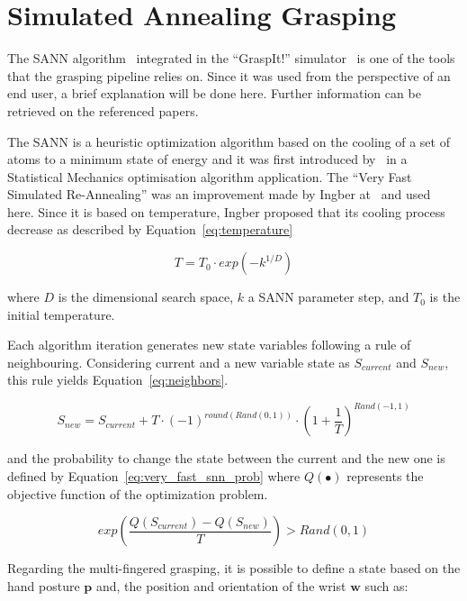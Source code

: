 \section{Simulated Annealing Grasping}
\label{sec:sim_ann}

The \ac{SANN} algorithm~\cite{Ciocarlie2009} integrated in the ``GraspIt!'' simulator~\cite{AndrewT2004} is one of the tools that the grasping pipeline relies on. Since it was used from the perspective of an end user, a brief explanation will be done here. Further information can be retrieved on the referenced papers.

The \ac{SANN} is a heuristic optimization algorithm based on the cooling of a set of atoms to a minimum state of energy and it was first introduced by~\cite{kirkpatrick1983} in a Statistical Mechanics optimisation algorithm application. The ``Very Fast Simulated Re-Annealing'' was an improvement made by Ingber at~\cite{ingber1988} and used here. Since it is based on temperature, Ingber proposed that its cooling process decrease as described by Equation~\ref{eq:temperature}

\begin{equation}
T=T_{0} \cdot exp{(-k^{1/D})}
\label{eq:temperature}
\end{equation}

\noindent
where $D$ is the dimensional search space, $k$ a \ac{SANN} parameter step, and $T_0$ is the initial temperature.

Each algorithm iteration generates new state variables following a rule of neighbouring. Considering current and a new variable state as $S_{current}$ and $S_{new}$, this rule yields Equation~\ref{eq:neighbors}.

\begin{equation}
S_{new}=S_{current}+T \cdot(-1)^{round(Rand(0,1))} \cdot\left(1+\frac{1}{T}\right)^{Rand(-1,1)}
\label{eq:neighbors}
\end{equation}

\noindent
and the probability to change the state between the current and the new one is defined by Equation~\ref{eq:very_fast_snn_prob} where $Q(\bullet)$ represents the objective function of the optimization problem.

\begin{equation}
exp({\frac{Q(S_{current})-Q(S_{new})}{T}})>Rand(0,1)
\label{eq:very_fast_snn_prob}
\end{equation}

Regarding the multi-fingered grasping, it is possible to define a state based on the hand posture $\mathbf{p}$ and, the position and orientation of the wrist $\mathbf{w}$ such as:

